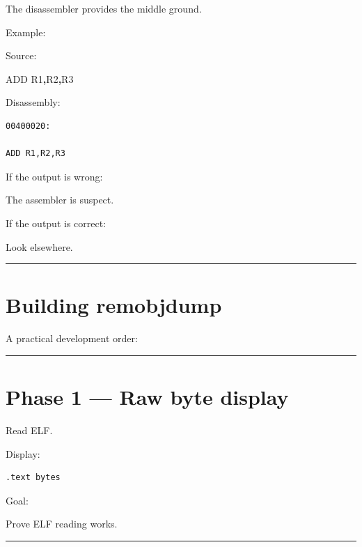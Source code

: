 \documentclass[
  oneside,
  openany]{book}
\newenvironment{Shaded}{\begin{snugshade}}{\end{snugshade}}
\newcommand{\BuiltInTok}[1]{#1}
\newcommand{\NormalTok}[1]{#1}
\newcommand{\OperatorTok}[1]{\textcolor[rgb]{0.81,0.36,0.00}{\textbf{#1}}}
\begin{document}
The disassembler provides the middle ground.

Example:

Source:

\begin{Shaded}
\begin{Highlighting}[]
\BuiltInTok{ADD}\NormalTok{ R1}\OperatorTok{,}\NormalTok{R2}\OperatorTok{,}\NormalTok{R3}
\end{Highlighting}
\end{Shaded}

Disassembly:

\begin{verbatim}
00400020:

ADD R1,R2,R3
\end{verbatim}

If the output is wrong:

The assembler is suspect.

If the output is correct:

Look elsewhere.

\begin{center}\rule{0.5\linewidth}{0.5pt}\end{center}

\hypertarget{building-remobjdump}{%
\section{Building remobjdump}\label{building-remobjdump}}

A practical development order:

\begin{center}\rule{0.5\linewidth}{0.5pt}\end{center}

\hypertarget{phase-1-raw-byte-display}{%
\section{Phase 1 --- Raw byte display}\label{phase-1-raw-byte-display}}

Read ELF.

Display:

\begin{verbatim}
.text bytes
\end{verbatim}

Goal:

Prove ELF reading works.

\begin{center}\rule{0.5\linewidth}{0.5pt}\end{center}
\end{document}
